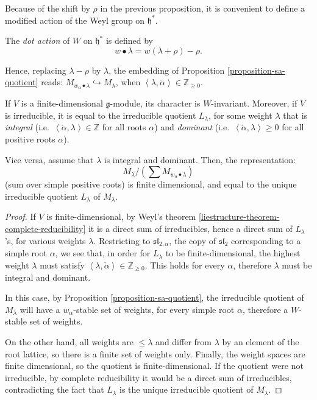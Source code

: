 Because of the shift by $\rho$ in the previous proposition, it is convenient to define a modified action of the Weyl group on $\mathfrak h^*$.

\begin{definition}
\label{definition-dot-action}
 The {\it dot action} of $W$ on $\mathfrak h^*$ is defined by 
 $$ w\bullet \lambda = w(\lambda+\rho) - \rho.$$
\end{definition}

Hence, replacing $\lambda-\rho$ by $\lambda$, the embedding of Proposition \ref{proposition-sa-quotient} reads: $M_{w_\alpha \bullet \lambda} \hookrightarrow M_\lambda$, when $\left< \lambda, \check\alpha\right> \in \mathbb Z_{\ge 0}$. 

\begin{proposition}
\label{proposition-finite-dimensional}
If $V$ is a finite-dimensional $\mathfrak g$-module, its character is $W$-invariant. Moreover, if $V$ is irreducible, it is equal to the irreducible quotient $L_\lambda$, for some weight $\lambda$ that is \emph{integral} (i.e.\ $\left< \check\alpha,\lambda\right>\in \mathbb Z$ for all roots $\alpha$) and \emph{dominant} (i.e.\ $\left< \check\alpha,\lambda\right> \ge 0$ for all positive roots $\alpha$).

Vice versa, assume that $\lambda$ is integral and dominant. Then, the representation:
$$M_{\lambda}/\left(\sum M_{w_\alpha\bullet \lambda}\right)$$
(sum over simple positive roots) is finite dimensional, and equal to the unique irreducible quotient $L_{\lambda}$ of $M_{\lambda}$. \end{proposition}

\begin{proof}
If $V$ is finite-dimensional, by Weyl's theorem \ref{liestructure-theorem-complete-reducibility} it is a direct sum of irreducibles, hence a direct sum of $L_\lambda$'s, for various weights $\lambda$. Restricting to $\mathfrak{sl}_{2,\alpha}$, the copy of $\mathfrak{sl}_2$ corresponding to a simple root $\alpha$, we see that, in order for $L_\lambda$ to be finite-dimensional, the highest weight $\lambda$ must satisfy $\left< \lambda, \check\alpha \right> \in \mathbb Z_{\ge 0}$. This holds for every $\alpha$, therefore $\lambda$ must be integral and dominant. 

In this case, by Proposition \ref{proposition-sa-quotient}, the irreducible quotient of $M_\lambda$ will have a $w_\alpha$-stable set of weights, for every simple root $\alpha$, therefore a $W$-stable set of weights. 

On the other hand, all weights are $\le \lambda$ and differ from $\lambda$ by an element of the root lattice, so there is a finite set of weights only. Finally, the weight spaces are finite dimensional, so the quotient is finite-dimensional. If the quotient were not irreducible, by complete reducibility it would be a direct sum of irreducibles, contradicting the fact that $L_\lambda$ is the unique irreducible quotient of $M_\lambda$. 
\end{proof}



